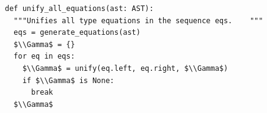 \documentclass[border=10pt]{standalone}
\begin{document}
\begin{lstlisting}
def unify_all_equations(ast: AST):
  """Unifies all type equations in the sequence eqs.    """
  eqs = generate_equations(ast)
  $\\Gamma$ = {}
  for eq in eqs:
    $\\Gamma$ = unify(eq.left, eq.right, $\\Gamma$)
    if $\\Gamma$ is None:
      break
  $\\Gamma$
\end{lstlisting}
\end{document}
